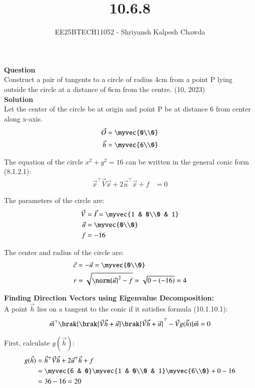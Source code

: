 \documentclass[article]{IEEEtran}
\begin{document}
	\title{10.6.8}
	\author{EE25BTECH11052 - Shriyansh Kalpesh Chawda}
	\maketitle
	\textbf{Question}\\
	Construct a pair of tangents to a circle of radius 4cm from a point P lying outside the circle at 
	a distance of 6cm from the centre.
	\hfill{(10, 2023)}\\
	
	\textbf{Solution}\\
	Let the center of the circle be at origin and point P be at distance 6 from center along x-axis.
	\begin{align}
		\vec{O} &= \myvec{0\\0}\\
		\vec{h} &= \myvec{6\\0}
	\end{align}
	
	The equation of the circle $x^2 + y^2 = 16$ can be written in the general conic form (8.1.2.1):
	\begin{align}
		\vec{x}^\top \vec{V}\vec{x} + 2\vec{u}^\top\vec{x} + f &= 0
	\end{align}
	
	The parameters of the circle are:
	\begin{align}
		\vec{V} &= \vec{I} = \myvec{1 & 0\\0 & 1}\\
		\vec{u} &= \myvec{0\\0}\\
		f &= -16
	\end{align}
	
	The center and radius of the circle are:
	\begin{align}
		\vec{c} &= -\vec{u} = \myvec{0\\0}\\
		r &= \sqrt{\norm{\vec{u}}^2 - f} = \sqrt{0 - (-16)} = 4
	\end{align}
	
	\textbf{Finding Direction Vectors using Eigenvalue Decomposition:}\\
	A point $\vec{h}$ lies on a tangent to the conic if it satisfies formula (10.1.10.1):
	\begin{align}
		\vec{m}^\top\brak{\brak{\vec{V}\vec{h} + \vec{u}}\brak{\vec{V}\vec{h} + \vec{u}}^\top - \vec{V}g(\vec{h})}\vec{m} = 0
	\end{align}
	
	First, calculate $g(\vec{h})$:
	\begin{align}
		g(\vec{h}) &= \vec{h}^\top\vec{V}\vec{h} + 2\vec{u}^\top\vec{h} + f\\
		&= \myvec{6 & 0}\myvec{1 & 0\\0 & 1}\myvec{6\\0} + 0 - 16\\
		&= 36 - 16 = 20
	\end{align}
	
\end{document}
